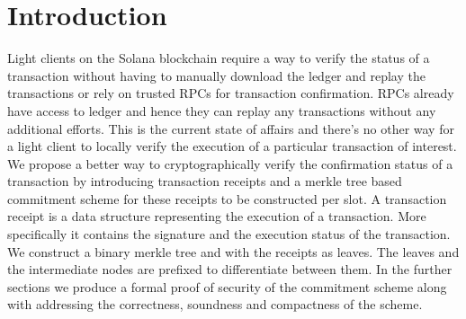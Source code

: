 \section{Introduction}
Light clients on the Solana blockchain require a way to verify the status of a transaction 
without having to manually download the ledger and replay the transactions or rely on 
trusted RPCs for transaction confirmation. RPCs already have access to ledger and hence 
they can replay any transactions without any additional efforts. This is the current state 
of affairs and there's no other way for a light client to locally verify the execution 
of a particular transaction of interest. We propose a better way to cryptographically
verify the confirmation status of a transaction by introducing transaction receipts 
and a merkle tree based commitment scheme for these receipts to be constructed per slot.
A transaction receipt is a data structure representing the execution of a transaction. 
More specifically it contains the signature and the execution status of the transaction. 
We construct a binary merkle tree and with the receipts as leaves. The leaves and the 
intermediate nodes are prefixed to differentiate between them. In the further sections 
we produce a formal proof of security of the commitment scheme along with addressing 
the correctness, soundness and compactness of the scheme.
